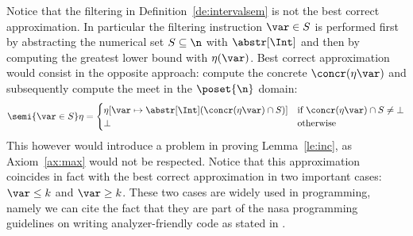 Notice that the filtering in Definition~\ref{de:intervalsem} is not
the best correct approximation. In particular the filtering
instruction \(\var\in S\) is performed first by abstracting the
numerical set \(S \subseteq \n\) with \(\abstr[\Int]\) and then by
computing the greatest lower bound with \(\eta(\var)\). Best correct
approximation would consist in the opposite approach: compute the
concrete \(\concr(\eta\var)\) and subsequently compute the meet in
the \(\poset{\n}\) domain:
\begin{equation*}
  \semi{\var\in S}\eta = \begin{cases}
    \eta[\var \mapsto \abstr[\Int](\concr(\eta\var) \cap S)]
    & \text{if } \concr(\eta\var) \cap S \neq \bot \\
    \bot & \text{otherwise}
  \end{cases}
\end{equation*}
This however would introduce a problem in proving Lemma~\ref{le:inc},
as Axiom~\ref{ax:max} would not be respected.  Notice that this
approximation coincides in fact with the best correct approximation in
two important cases: \(\var \leq k\) and \(\var \geq k\). These two
cases are widely used in programming, namely we can cite the fact that
they are part of the nasa programming guidelines on writing
analyzer-friendly code as stated in \cite{nasa:ten}.
